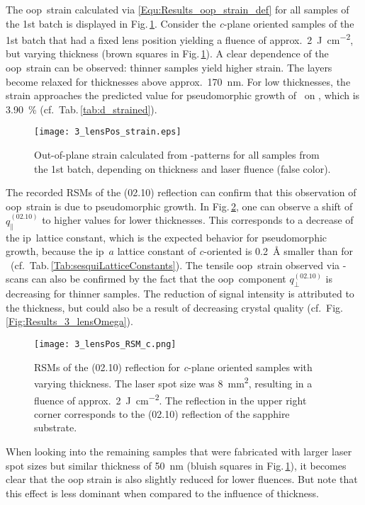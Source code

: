 The \gls{oop}\ strain calculated via \eqref{Equ:Results_oop_strain_def} for all samples of the 1st batch is displayed in Fig.\,\ref{Fig:Results_3_lensStrain}.
Consider the \textit{c}-plane oriented samples of the 1st batch that had a fixed lens position yielding a fluence of approx.\ \qty{2}{\joule\per\cm\squared}, but varying thickness (brown squares in Fig.\,\ref{Fig:Results_3_lensStrain}).
A clear dependence of the \gls{oop}\ strain can be observed: thinner samples yield higher strain.
The layers become relaxed for thicknesses above approx.\ \qty{170}{\nm}.
For low thicknesses, the strain approaches the predicted value for pseudomorphic growth of \cro\ on , which is \qty{3.90}{\percent} (cf.\ Tab.\,\ref{tab:d_strained}).
\begin{figure}
    \centering
    \texttt{[image: 3\_lensPos\_strain.eps]}
    \caption{
        Out-of-plane strain calculated from \thetaomega-patterns for all samples from the 1st batch, depending on thickness and laser fluence (false color).
    }
    \label{Fig:Results_3_lensStrain}
\end{figure}
The recorded \glspl{RSM} of the (02.10) reflection can confirm that this observation of \gls{oop}\ strain is due to pseudomorphic growth.
In Fig.\,\ref{Fig:Results_3_cRSMs}, one can observe a shift of $q_\parallel^{(02.10)}$ to higher values for lower thicknesses.
This corresponds to a decrease of the \gls{ip}\ lattice constant, which is the expected behavior for pseudomorphic growth, because the \gls{ip}\ $a$ lattice constant of \textit{c}-oriented  is \qty{0.2}{\angstrom} smaller than for \cro\ (cf.~Tab.\,\ref{Tab:sesquiLatticeConstants}).
The tensile \gls{oop}\ strain observed via \thetaomega-scans can also be confirmed by the fact that the \gls{oop}\ component $q_\perp^{(02.10)}$ is decreasing for thinner samples.
The reduction of signal intensity is attributed to the thickness, but could also be a result of decreasing crystal quality (cf.~Fig.\,\ref{Fig:Results_3_lensOmega}).
\begin{figure}
    \centering
    \texttt{[image: 3\_lensPos\_RSM\_c.png]}
    \caption{
        \glspl{RSM} of the (02.10) reflection for \textit{c}-plane oriented samples with varying thickness.
        The laser spot size was \qty{8}{\mm\squared}, resulting in a fluence of approx.\ \qty{2}{\J\per\cm\squared}.
        The reflection in the upper right corner corresponds to the (02.10) reflection of the sapphire substrate.
    }
    \label{Fig:Results_3_cRSMs}
\end{figure}
When looking into the remaining samples that were fabricated with larger laser spot sizes but similar thickness of \qty{50}{\nm} (bluish squares in Fig.\,\ref{Fig:Results_3_lensStrain}), it becomes clear that the \gls{oop} strain is also slightly reduced for lower fluences.
But note that this effect is less dominant when compared to the influence of thickness.

